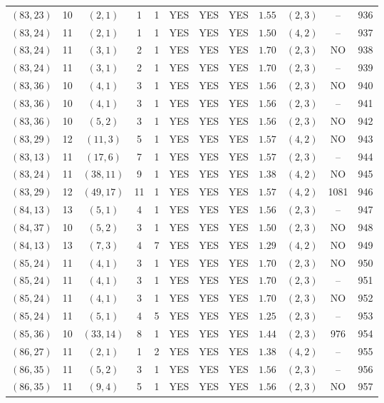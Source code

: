 \begin{longtable}{|c|c|c|c|c|c|c|c|c|c|c|c|}
$(83,23)$ & 10 & $(2,1)$ & 1 & 1 & YES & YES & YES & $1.55$ & $(2,3)$ & -- & 936\\
$(83,24)$ & 11 & $(2,1)$ & 1 & 1 & YES & YES & YES & $1.50$ & $(4,2)$ & -- & 937\\
$(83,24)$ & 11 & $(3,1)$ & 2 & 1 & YES & YES & YES & $1.70$ & $(2,3)$ & NO & 938\\
$(83,24)$ & 11 & $(3,1)$ & 2 & 1 & YES & YES & YES & $1.70$ & $(2,3)$ & -- & 939\\
$(83,36)$ & 10 & $(4,1)$ & 3 & 1 & YES & YES & YES & $1.56$ & $(2,3)$ & NO & 940\\
$(83,36)$ & 10 & $(4,1)$ & 3 & 1 & YES & YES & YES & $1.56$ & $(2,3)$ & -- & 941\\
$(83,36)$ & 10 & $(5,2)$ & 3 & 1 & YES & YES & YES & $1.56$ & $(2,3)$ & NO & 942\\
$(83,29)$ & 12 & $(11,3)$ & 5 & 1 & YES & YES & YES & $1.57$ & $(4,2)$ & NO & 943\\
$(83,13)$ & 11 & $(17,6)$ & 7 & 1 & YES & YES & YES & $1.57$ & $(2,3)$ & -- & 944\\
$(83,24)$ & 11 & $(38,11)$ & 9 & 1 & YES & YES & YES & $1.38$ & $(4,2)$ & NO & 945\\
$(83,29)$ & 12 & $(49,17)$ & 11 & 1 & YES & YES & YES & $1.57$ & $(4,2)$ & 1081 & 946\\
$(84,13)$ & 13 & $(5,1)$ & 4 & 1 & YES & YES & YES & $1.56$ & $(2,3)$ & -- & 947\\
$(84,37)$ & 10 & $(5,2)$ & 3 & 1 & YES & YES & YES & $1.50$ & $(2,3)$ & NO & 948\\
$(84,13)$ & 13 & $(7,3)$ & 4 & 7 & YES & YES & YES & $1.29$ & $(4,2)$ & NO & 949\\
$(85,24)$ & 11 & $(4,1)$ & 3 & 1 & YES & YES & YES & $1.70$ & $(2,3)$ & NO & 950\\
$(85,24)$ & 11 & $(4,1)$ & 3 & 1 & YES & YES & YES & $1.70$ & $(2,3)$ & -- & 951\\
$(85,24)$ & 11 & $(4,1)$ & 3 & 1 & YES & YES & YES & $1.70$ & $(2,3)$ & NO & 952\\
$(85,24)$ & 11 & $(5,1)$ & 4 & 5 & YES & YES & YES & $1.25$ & $(2,3)$ & -- & 953\\
$(85,36)$ & 10 & $(33,14)$ & 8 & 1 & YES & YES & YES & $1.44$ & $(2,3)$ & 976 & 954\\
$(86,27)$ & 11 & $(2,1)$ & 1 & 2 & YES & YES & YES & $1.38$ & $(4,2)$ & -- & 955\\
$(86,35)$ & 11 & $(5,2)$ & 3 & 1 & YES & YES & YES & $1.56$ & $(2,3)$ & -- & 956\\
$(86,35)$ & 11 & $(9,4)$ & 5 & 1 & YES & YES & YES & $1.56$ & $(2,3)$ & NO & 957\\

\end{longtable}
